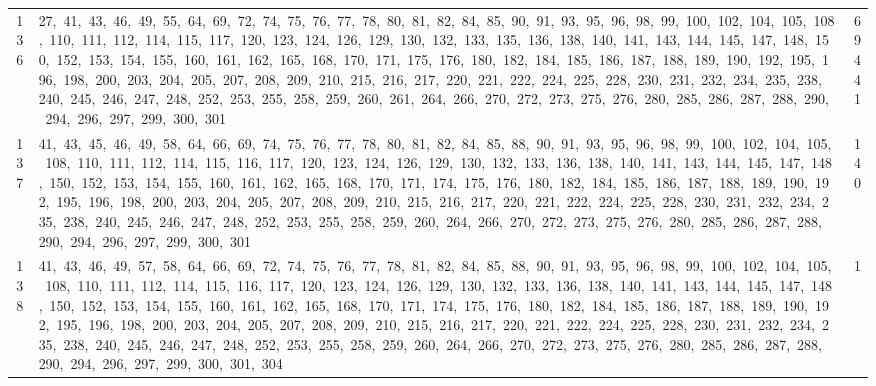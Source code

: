 \begin{longtable}{c|p{}|r}
136 & 27,\ 41,\ 43,\ 46,\ 49,\ 55,\ 64,\ 69,\ 72,\ 74,\ 75,\ 76,\ 77,\ 78,\ 80,\ 81,\ 82,\ 84,\ 85,\ 90,\ 91,\ 93,\ 95,\ 96,\ 98,\ 99,\ 100,\ 102,\ 104,\ 105,\ 108,\ 110,\ 111,\ 112,\ 114,\ 115,\ 117,\ 120,\ 123,\ 124,\ 126,\ 129,\ 130,\ 132,\ 133,\ 135,\ 136,\ 138,\ 140,\ 141,\ 143,\ 144,\ 145,\ 147,\ 148,\ 150,\ 152,\ 153,\ 154,\ 155,\ 160,\ 161,\ 162,\ 165,\ 168,\ 170,\ 171,\ 175,\ 176,\ 180,\ 182,\ 184,\ 185,\ 186,\ 187,\ 188,\ 189,\ 190,\ 192,\ 195,\ 196,\ 198,\ 200,\ 203,\ 204,\ 205,\ 207,\ 208,\ 209,\ 210,\ 215,\ 216,\ 217,\ 220,\ 221,\ 222,\ 224,\ 225,\ 228,\ 230,\ 231,\ 232,\ 234,\ 235,\ 238,\ 240,\ 245,\ 246,\ 247,\ 248,\ 252,\ 253,\ 255,\ 258,\ 259,\ 260,\ 261,\ 264,\ 266,\ 270,\ 272,\ 273,\ 275,\ 276,\ 280,\ 285,\ 286,\ 287,\ 288,\ 290,\ 294,\ 296,\ 297,\ 299,\ 300,\ 301 & 69441 \\
137 & 41,\ 43,\ 45,\ 46,\ 49,\ 58,\ 64,\ 66,\ 69,\ 74,\ 75,\ 76,\ 77,\ 78,\ 80,\ 81,\ 82,\ 84,\ 85,\ 88,\ 90,\ 91,\ 93,\ 95,\ 96,\ 98,\ 99,\ 100,\ 102,\ 104,\ 105,\ 108,\ 110,\ 111,\ 112,\ 114,\ 115,\ 116,\ 117,\ 120,\ 123,\ 124,\ 126,\ 129,\ 130,\ 132,\ 133,\ 136,\ 138,\ 140,\ 141,\ 143,\ 144,\ 145,\ 147,\ 148,\ 150,\ 152,\ 153,\ 154,\ 155,\ 160,\ 161,\ 162,\ 165,\ 168,\ 170,\ 171,\ 174,\ 175,\ 176,\ 180,\ 182,\ 184,\ 185,\ 186,\ 187,\ 188,\ 189,\ 190,\ 192,\ 195,\ 196,\ 198,\ 200,\ 203,\ 204,\ 205,\ 207,\ 208,\ 209,\ 210,\ 215,\ 216,\ 217,\ 220,\ 221,\ 222,\ 224,\ 225,\ 228,\ 230,\ 231,\ 232,\ 234,\ 235,\ 238,\ 240,\ 245,\ 246,\ 247,\ 248,\ 252,\ 253,\ 255,\ 258,\ 259,\ 260,\ 264,\ 266,\ 270,\ 272,\ 273,\ 275,\ 276,\ 280,\ 285,\ 286,\ 287,\ 288,\ 290,\ 294,\ 296,\ 297,\ 299,\ 300,\ 301 & 140 \\
138 & 41,\ 43,\ 46,\ 49,\ 57,\ 58,\ 64,\ 66,\ 69,\ 72,\ 74,\ 75,\ 76,\ 77,\ 78,\ 81,\ 82,\ 84,\ 85,\ 88,\ 90,\ 91,\ 93,\ 95,\ 96,\ 98,\ 99,\ 100,\ 102,\ 104,\ 105,\ 108,\ 110,\ 111,\ 112,\ 114,\ 115,\ 116,\ 117,\ 120,\ 123,\ 124,\ 126,\ 129,\ 130,\ 132,\ 133,\ 136,\ 138,\ 140,\ 141,\ 143,\ 144,\ 145,\ 147,\ 148,\ 150,\ 152,\ 153,\ 154,\ 155,\ 160,\ 161,\ 162,\ 165,\ 168,\ 170,\ 171,\ 174,\ 175,\ 176,\ 180,\ 182,\ 184,\ 185,\ 186,\ 187,\ 188,\ 189,\ 190,\ 192,\ 195,\ 196,\ 198,\ 200,\ 203,\ 204,\ 205,\ 207,\ 208,\ 209,\ 210,\ 215,\ 216,\ 217,\ 220,\ 221,\ 222,\ 224,\ 225,\ 228,\ 230,\ 231,\ 232,\ 234,\ 235,\ 238,\ 240,\ 245,\ 246,\ 247,\ 248,\ 252,\ 253,\ 255,\ 258,\ 259,\ 260,\ 264,\ 266,\ 270,\ 272,\ 273,\ 275,\ 276,\ 280,\ 285,\ 286,\ 287,\ 288,\ 290,\ 294,\ 296,\ 297,\ 299,\ 300,\ 301,\ 304 & 1 \\

\end{longtable}
